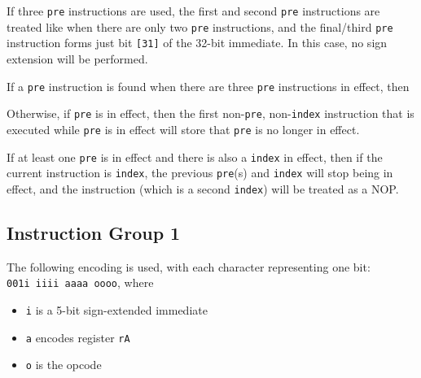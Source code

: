 \documentclass{article}
\begin{document}
	If three \texttt{pre} instructions are used, the first and second
	\texttt{pre} instructions are treated like when there are only two
	\texttt{pre} instructions, and the final/third \texttt{pre} instruction
	forms just bit \texttt{[31]} of the 32-bit immediate.  In this case, no
	sign extension will be performed.


	If a \texttt{pre} instruction is found when there are three
	\texttt{pre} instructions in effect, then 

	Otherwise, if \texttt{pre} is in effect, then the first
	non-\texttt{pre}, non-\texttt{index} instruction that is executed while
	\texttt{pre} is in effect will store that \texttt{pre} is no longer in
	effect.

	If at least one \texttt{pre} is in effect and there is also a
	\texttt{index} in effect, then if the current instruction is
	\texttt{index}, the previous \texttt{pre}(s) and \texttt{index} will
	stop being in effect, and the instruction (which is a second
	\texttt{index}) will be treated as a NOP.




	\subsection{Instruction Group 1}
	The following encoding is used, with each character representing one
	bit:  \\
	\texttt{001i iiii aaaa oooo}, where

	\singlespacing
	\begin{itemize}
		\item \texttt{i} is a 5-bit sign-extended immediate
		\item \texttt{a} encodes register \texttt{rA}
		\item \texttt{o} is the opcode
	\end{itemize}
	\doublespacing
\end{document}
